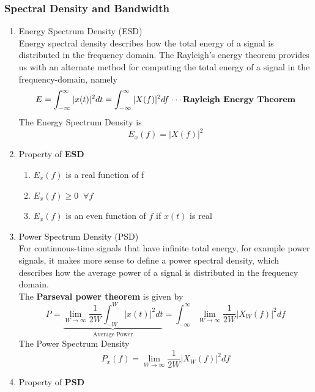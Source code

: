 \documentclass{article}
\begin{document}
\subsubsection{Spectral Density and Bandwidth}
\begin{enumerate}
    \item  Energy Spectrum Density (ESD) \\
    Energy spectral density describes how the total energy of a signal is distributed in the frequency domain. The Rayleigh’s energy theorem provides us with an alternate method for computing the total energy of a signal in the frequency-domain, namely
    \begin{equation}
        E = \int^{\infty}_{-\infty}|x(t)|^2dt = \int^{\infty}_{-\infty}|X(f)|^2df \; \text{$\cdots$\textbf{Rayleigh Energy Theorem}}
    \end{equation}
    The Energy Spectrum Density is 
    \begin{equation}
        E_x(f) = |X(f)|^2
    \end{equation}
    \item Property of \textbf{ESD} 
        \begin{enumerate}
            \item $E_x(f)$ is a real function of f
            \item $E_x(f) \geq 0 \;\; \forall f$
            \item $E_x(f)$ is an even function of $f$ if $x(t)$ is real
        \end{enumerate}
    \item Power Spectrum Density (PSD) \\
    For continuous-time signals that have infinite total energy, for example power signals, it makes more sense to define a power spectral density, which describes how the average power of a signal is distributed in the frequency domain.\\
    The \textbf{Parseval power theorem} is given by
    \begin{equation}
        P = \underbrace{\lim_{W\rightarrow\infty}\frac{1}{2W}\int^W_{-W}|x(t)|^2dt}_\text{Average Power} = \int^{\infty}_{-\infty}\lim_{W\rightarrow\infty}\frac{1}{2W}|X_W(f)|^2df
    \end{equation}
    The Power Spectrum Density
    \begin{equation}
        P_x(f) = \lim_{W\rightarrow\infty}\frac{1}{2W}|X_W(f)|^2df
    \end{equation}
    \item Property of \textbf{PSD}

\end{enumerate}
\end{document}
